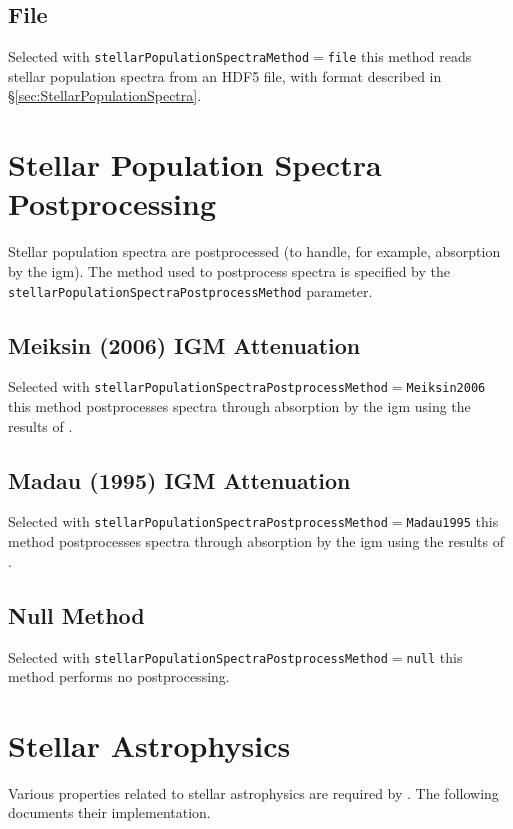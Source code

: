 \subsection{File}

Selected with {\tt stellarPopulationSpectraMethod}$=${\tt file} this method reads stellar population spectra from an HDF5 file, with format described in \S\ref{sec:StellarPopulationSpectra}.

\section{Stellar Population Spectra Postprocessing}

Stellar population spectra are postprocessed (to handle, for example, absorption by the \gls{igm}). The method used to postprocess spectra is specified by the {\tt stellarPopulationSpectraPostprocessMethod} parameter.

\subsection{Meiksin (2006) IGM Attenuation}

Selected with {\tt stellarPopulationSpectraPostprocessMethod}$=${\tt Meiksin2006} this method postprocesses spectra through absorption by the \gls{igm} using the results of \cite{meiksin_colour_2006}.

\subsection{Madau (1995) IGM Attenuation}

Selected with {\tt stellarPopulationSpectraPostprocessMethod}$=${\tt Madau1995} this method postprocesses spectra through absorption by the \gls{igm} using the results of \cite{madau_radiative_1995}.

\subsection{Null Method}

Selected with {\tt stellarPopulationSpectraPostprocessMethod}$=${\tt null} this method performs no postprocessing.

\section{Stellar Astrophysics}

Various properties related to stellar astrophysics are required by \glc. The following documents their implementation.

